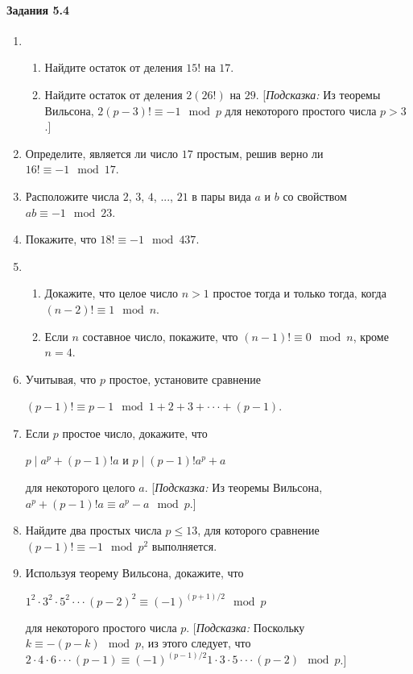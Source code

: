 \documentclass[11pt]{article}
\begin{document}
\paragraph{Задания 5.4}
\begin{enumerate}
	\item\begin{enumerate}
		\item Найдите остаток от деления $15!$ на $17$.
		\item Найдите остаток от деления $2(26!)$ на $29$. [\textit{Подсказка:} Из теоремы Вильсона, $2(p-3)!\equiv-1\mod p$ для некоторого простого числа $p>3$.]
		\end{enumerate}
	\item Определите, является ли число $17$ простым, решив верно ли $16!\equiv-1\mod 17$.
	\item Расположите числа $2$, $3$, $4$, ..., $21$ в пары вида $a$ и $b$ со свойством $ab\equiv-1\mod23$.
	\item Покажите, что $18!\equiv-1\mod437$.
	\item\begin{enumerate}
		\item Докажите, что целое число $n>1$ простое тогда и только тогда, когда $(n-2)!\equiv1\mod n$.
		\item Если $n$ составное число, покажите, что $(n-1)!\equiv0\mod n$, кроме $n=4$.
		\end{enumerate}
	\item Учитывая, что $p$ простое, установите сравнение
	\begin{center}
		$(p-1)!\equiv p-1\mod 1+2+3+\cdot\cdot\cdot+(p-1)$.
	\end{center}
	\item Если $p$ простое число, докажите, что
	\begin{center}
		$p\mid a^p+(p-1)!a$ и $p\mid(p-1)!a^p+a$
	\end{center}
	для некоторого целого $a$. [\textit{Подсказка:} Из теоремы Вильсона, $a^p+(p-1)!a\equiv a^p-a\mod p$.]
	\item Найдите два простых числа $p\le13$, для которого сравнение $(p-1)!\equiv-1\mod p^2$ выполняется.
	\item Используя теорему Вильсона, докажите, что 
	\begin{center}
		$1^2\cdot3^2\cdot5^2\cdot\cdot\cdot(p-2)^2\equiv(-1)^{(p+1)/2}\mod p$
	\end{center}
	для некоторого простого числа $p$. [\textit{Подсказка:} Поскольку $k\equiv-(p-k)\mod p$, из этого следует, что $2\cdot4\cdot6\cdot\cdot\cdot(p-1)\equiv(-1)^{(p-1)/2}1\cdot3\cdot5\cdot\cdot\cdot(p-2)\mod p$.]

\end{enumerate}
\end{document}
